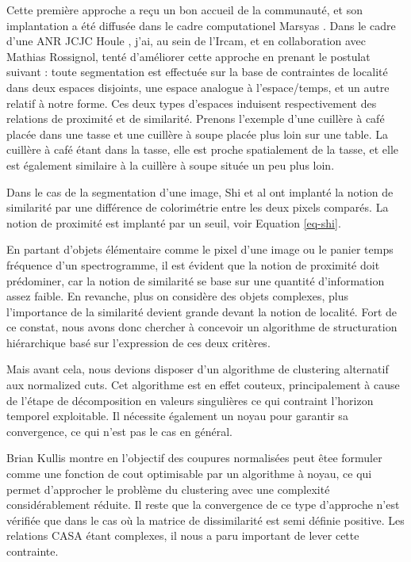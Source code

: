 Cette première approche a reçu un bon accueil de la communauté\cite{conf, lagrangeTaslp08}, et son implantation a été diffusée dans le cadre computationel Marsyas \cite{}. Dans le cadre d'une ANR JCJC Houle \url{}, j'ai, au sein de l'Ircam, et en collaboration avec Mathias Rossignol, tenté d'améliorer cette approche en prenant le postulat suivant : toute segmentation est effectuée sur la base de contraintes de localité dans deux espaces disjoints, une espace analogue à l'espace/temps, et un autre relatif à notre forme. Ces deux types d'espaces induisent respectivement des relations de proximité et de similarité. Prenons l'exemple d'une cuillère à café placée dans une tasse et une cuillère à soupe placée plus loin sur une table. La cuillère à café étant dans la tasse, elle est proche spatialement de la tasse, et elle est également similaire à la cuillère à soupe située un peu plus loin.

Dans le cas de la segmentation d'une image, Shi et al ont implanté la notion de similarité par une différence de colorimétrie entre les deux pixels comparés. La notion de proximité est implanté par un seuil, voir Equation \ref{eq-shi}.

En partant d'objets élémentaire comme le pixel d'une image ou le panier temps fréquence d'un spectrogramme, il est évident que la notion de proximité doit prédominer, car la notion de similarité se base sur une quantité d'information assez faible.  En revanche, plus on considère des objets complexes, plus l'importance de la similarité devient grande devant la notion de localité. Fort de ce constat, nous avons donc chercher à concevoir un algorithme de structuration hiérarchique basé sur l'expression de ces deux critères.

Mais avant cela, nous devions disposer d'un algorithme de clustering alternatif aux normalized cuts. Cet algorithme est en effet couteux, principalement à cause de l'étape de décomposition en valeurs singulières ce qui contraint l'horizon temporel exploitable. Il nécessite également un noyau pour garantir sa convergence, ce qui n'est pas le cas en général.

Brian Kullis montre en  l'objectif des coupures normalisées peut êtee formuler comme une fonction de cout optimisable par un algorithme à noyau, ce qui permet d'approcher le problème du clustering avec une complexité considérablement réduite. Il reste que la convergence de ce type d'approche n'est vérifiée que dans le cas où la matrice de dissimilarité est semi définie positive. Les relations CASA étant complexes, il nous a paru important de lever cette contrainte.

